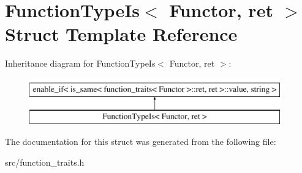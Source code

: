\hypertarget{struct_function_type_is}{\section{Function\-Type\-Is$<$ Functor, ret $>$ Struct Template Reference}
\label{struct_function_type_is}
}
Inheritance diagram for Function\-Type\-Is$<$ Functor, ret $>$\-:\begin{figure}[H]
\begin{center}
\leavevmode
\includegraphics[height=2.000000cm]{struct_function_type_is}
\end{center}
\end{figure}


The documentation for this struct was generated from the following file\-:\begin{DoxyCompactItemize}
\item 
src/function\-\_\-traits.\-h\end{DoxyCompactItemize}
